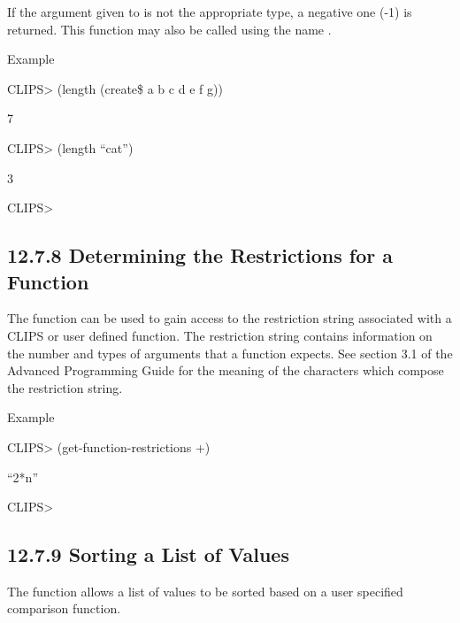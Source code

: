 \documentclass[letterpaper,10pt,english]{sphinxmanual}
\begin{document}
\begin{sphinxVerbatim}[commandchars=\\\{\}]
 
\end{sphinxVerbatim}

If the argument given to  is not the appropriate type, a
negative one (-1) is returned. This function may also be called using
the name .

Example

CLIPS\textgreater{} (length (create\$ a b c d e f g))

7

CLIPS\textgreater{} (length “cat”)

3

CLIPS\textgreater{}


\subsection{12.7.8 Determining the Restrictions for a Function}
\label{\detokenize{actions:determining-the-restrictions-for-a-function}}
The  function can be used to gain access to
the restriction string associated with a CLIPS or user defined function.
The restriction string contains information on the number and types of
arguments that a function expects. See section 3.1 of the Advanced
Programming Guide for the meaning of the characters which compose the
restriction string.


\begin{sphinxVerbatim}[commandchars=\\\{\}]
 
\end{sphinxVerbatim}

Example

CLIPS\textgreater{} (get-function-restrictions +)

“2*n”

CLIPS\textgreater{}


\subsection{12.7.9 Sorting a List of Values}
\label{\detokenize{actions:sorting-a-list-of-values}}
The function  allows a list of values to be sorted based on a
user specified comparison function.
\end{document}
